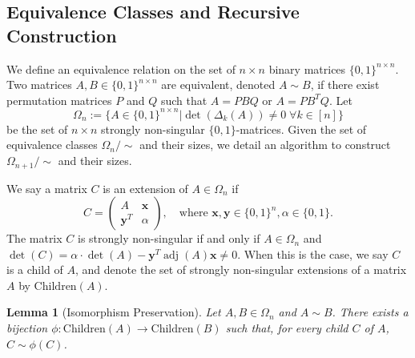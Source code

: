\documentclass[reqno]{amsart}
\numberwithin{equation}{section}
\newtheorem{lemma}[theorem]{Lemma}
\begin{document}
\subsection{Equivalence Classes and Recursive Construction}

We define an equivalence relation on the set of $n \times n$ binary matrices $\{0,1\}^{n \times n}$. Two matrices $A, B \in \{0,1\}^{n \times n}$ are equivalent, denoted $A \sim B$, if there exist permutation matrices $P$ and $Q$ such that $A = P B Q$ or $A = P B^T Q$. Let 
\[\Omega_n := \{ A \in \{0,1\}^{n \times n} | \det(\Delta_k(A)) \neq 0 \; \forall k \in [n] \}\]
be the set of $n\times n$ strongly non-singular $\{0,1\}$-matrices. Given the set of equivalence classes $\Omega_n/\sim$ and their sizes, we detail an algorithm to construct $\Omega_{n+1}/\sim$ and their sizes.

We say a matrix $C$ is an extension of $A \in \Omega_n$ if 
\[
C = \begin{pmatrix} A & \mathbf{x} \\ \mathbf{y}^T & \alpha \end{pmatrix}, \quad \text{where } \mathbf{x}, \mathbf{y} \in \{0,1\}^n, \alpha \in \{0,1\}.
\]
The matrix $C$ is strongly non-singular if and only if $A \in \Omega_n$ and $\det(C) = \alpha \cdot \det(A) -  \mathbf{y}^T \operatorname{adj}(A) \mathbf{x} \neq 0$. When this is the case, we say $C$ is a child of $A$, and denote the set of strongly non-singular extensions of a matrix $A$ by $\mathrm{Children}(A)$.



\begin{lemma}[Isomorphism Preservation]
Let $A, B \in \Omega_n$ and $A \sim B$. There exists a bijection $\phi: \mathrm{Children}(A) \to \mathrm{Children}(B)$ such that, for every child $C$ of $A$, $C \sim \phi(C)$.
\end{lemma}
\end{document}
